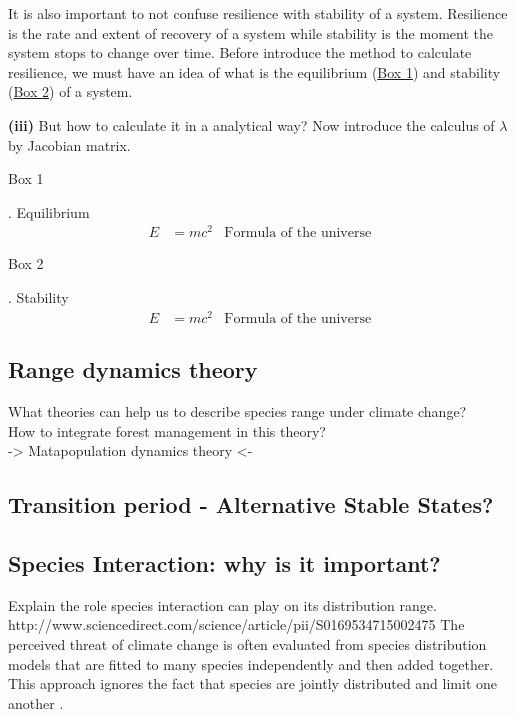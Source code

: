 It is also important to not confuse resilience with stability of a system. Resilience is the rate and extent of recovery of a system while stability is the moment the system stops to change over time. Before introduce the method to calculate resilience, we must have an idea of what is the equilibrium (\hyperlink{box1}{Box 1}) and stability (\hyperlink{box2}{Box 2}) of a system.

\textbf{(iii)} But how to calculate it in a analytical way?  Now introduce the calculus of $\lambda$ by Jacobian matrix.

\begin{tcolorbox}
\hypertarget{box1}{Box 1}. Equilibrium
\begin{align}
E &= mc^2 & \text{Formula of the universe}
\end{align}
\end{tcolorbox}

\begin{tcolorbox}
\hypertarget{box2}{Box 2}. Stability
\begin{align}
E &= mc^2 & \text{Formula of the universe}
\end{align}
\end{tcolorbox}

\subsection{Range dynamics theory}

What theories can help us to describe species range under climate change?\\
How to integrate forest management in this theory?\\
-> Matapopulation dynamics theory <-

\subsection{Transition period - Alternative Stable States?}

\subsection{Species Interaction: why is it important?}
Explain the role species interaction can play on its distribution range. \\
http://www.sciencedirect.com/science/article/pii/S0169534715002475
The perceived threat of climate change is often evaluated from species distribution models that are fitted to many species independently and then added together. This approach ignores the fact that species are jointly distributed and limit one another \citep{clark2014}.

